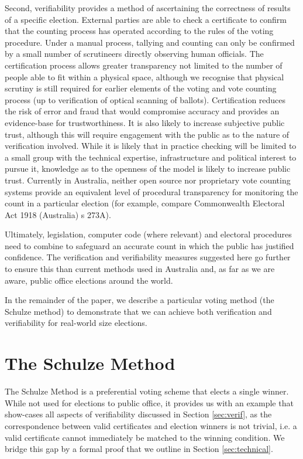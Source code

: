 \documentclass{llncs}
\begin{document}
Second, verifiability provides a method of ascertaining the
correctness of
results of a specific election. External parties are able to check a
certificate to confirm that the counting process has operated
according to the rules of the voting procedure.
Under a manual process, tallying and counting can only be confirmed by a small number of scrutineers directly observing human
officials. The certification process allows greater transparency not
limited to the number of people able to fit within a physical space,
although we recognise that physical scrutiny is still required for
earlier elements of the voting and vote counting process (up to
verification of optical scanning of ballots). Certification reduces
the risk of error and fraud that would compromise accuracy and
provides an evidence-base for trustworthiness. It is also likely to
increase subjective public trust, although this will require
engagement with the public as to the nature of verification
involved. While it is likely that in practice checking will be
limited to a small group with the technical expertise,
infrastructure and political interest to pursue it, knowledge as to
the openness of the model is likely to increase public trust.
Currently in Australia, neither open source nor proprietary vote
counting systems provide an equivalent level of procedural
transparency for monitoring the count in a particular election (for
example, compare Commonwealth Electoral Act 1918 (Australia) s
273A). 

Ultimately, legislation, computer code (where relevant) and
electoral procedures need to combine to safeguard an accurate count
in which the public has justified confidence. The verification and
verifiability measures suggested here go further to ensure this than
current methods used in Australia and, as far as we are aware,
public office elections around the world.

In the remainder of the paper, we describe a particular voting
method (the Schulze method) to demonstrate that we can achieve both
verification and verifiability for real-world size elections.



\section{The Schulze Method} \label{sec:schulze}
The Schulze Method \cite{Schulze:2011:NMC} is a preferential voting
scheme that elects a single winner. While not used for elections to
public office, it provides us with an example that show-cases all
aspects of verifiability discussed in Section \ref{sec:verif}, as
the correspondence between valid certificates and election winners
is not trivial, i.e. a valid certificate cannot immediately be
matched to the winning condition. We bridge this gap by a formal
proof that we outline in Section \ref{sec:technical}. 
\end{document}

